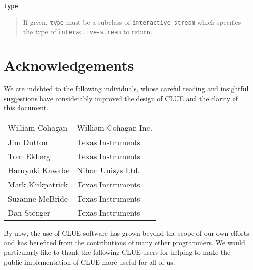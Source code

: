 \documentclass[twoside]{book}
\begin{document}
\begin{sloppy}
\begin{flushright}
{}\end{flushright}


\begin{flushright} \parbox[t]{6.125in}{
{\tt type}
\begin{quote}
If given, {\tt type} must be a subclass of {\tt interactive-stream} which
specifies the type of {\tt interactive-stream} to return.
\end{quote}

}\end{flushright}


\chapter{Acknowledgements} 
We are indebted to the following individuals, whose
careful reading and insightful suggestions have considerably improved the design
of CLUE and the clarity of this document.

\begin{tabular}{ll}
William Cohagan &       William Cohagan Inc.\\
Jim Dutton      &       Texas Instruments \\
Tom Ekberg      &       Texas Instruments \\
Haruyuki Kawabe &       Nihon Unisys Ltd. \\
Mark Kirkpatrick &      Texas Instruments \\
Suzanne McBride &       Texas Instruments \\
Dan Stenger     &       Texas Instruments \\
\end{tabular}

By now, the use of CLUE software has grown beyond the scope of our own efforts
and has benefited from the contributions of many other programmers. We would
particularly like to thank the following CLUE users for helping to make the
public implementation of CLUE more useful for all of us.


\end{sloppy}
\end{document}
